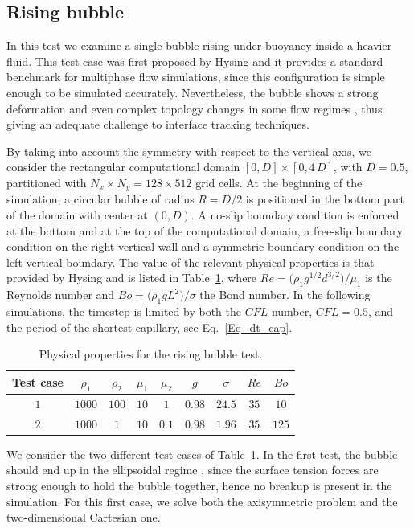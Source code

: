 \subsection{Rising bubble}

In this test we examine a single bubble rising under buoyancy inside a heavier fluid. This test case was first proposed by Hysing \cite{Hysing_2009_60} and it provides a standard benchmark for multiphase flow simulations, since this configuration is simple enough to be simulated accurately. Nevertheless, the bubble shows a strong deformation and even complex topology changes in some flow regimes \cite{Clift_1978, Legendre_2022_07}, thus giving an adequate challenge to interface tracking techniques. 

By taking into account the symmetry with respect to the vertical axis, we consider the rectangular computational domain $[0, D] \times [0, 4\,D]$, with $D=0.5$, partitioned with $N_x \times N_y = 128 \times 512$ grid cells. At the beginning of the simulation, a circular bubble of radius $R=D/2$ is positioned in the bottom part of the domain with center at $(0, D)$.
A no-slip boundary condition is enforced at the bottom and at the top of the computational domain, a free-slip boundary condition on the right vertical wall and a symmetric boundary condition on the left vertical boundary. The value of the relevant physical properties is that provided by Hysing \cite{Hysing_2009_60} and is listed in Table~\ref{Tab_para_rising},
where $Re = \big( \rho_1 g^{1/2} d^{3/2} \big) \big/ \mu_1$ is the Reynolds number and
$Bo = \big( \rho_1 g L^2 \big) \big/ \sigma$ the Bond number. In the following simulations, the timestep is limited by both the $CFL$ number, $CFL=0.5$, and the period of the shortest capillary, see Eq.~\eqref{Eq_dt_cap}.

\begin{table}[hbt!]
\caption{Physical properties for the rising bubble test.}
\centering
\begin{tabular}{ccccccccc}
\hline 
 Test case &$\rho_1$& $\rho_2$& $\mu_1$ & $\mu_2$ & $g$ & $\sigma$ & $Re$ & $Bo$ \\ 
\hline 
$1$ &$1000 $ & $100$ & $ 10$ & $1$ & $0.98$ &$24.5$ & $35$ & $10$ \\ 
$2$ &$1000 $ & $1$ & $ 10$ & $0.1$ & $0.98$ &$1.96$ & $35$ & $125$ \\ 
\hline 
\end{tabular}
\label{Tab_para_rising}
\end{table}
We consider the two different test cases of Table~\ref{Tab_para_rising}. In the first test, the bubble should end up in the ellipsoidal regime \cite{Hysing_2009_60}, since the surface tension forces are strong enough to hold the bubble together, hence no breakup is present in the simulation. For this first case, we solve both the axisymmetric problem and the two-dimensional Cartesian one.

